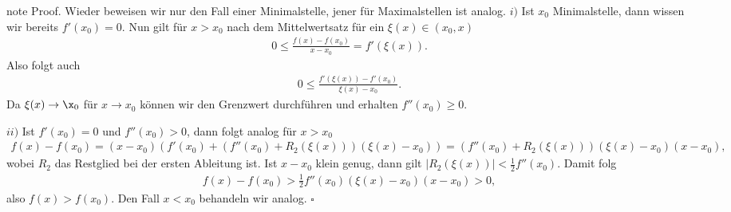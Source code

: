 \documentclass[letterpaper,10pt,english]{jupyterBook}
\begin{document}
\begin{sphinxadmonition}{note}
Proof. Wieder beweisen wir nur den Fall einer Minimalstelle, jener für Maximalstellen ist analog.
\(i)\) Ist \(x_0\) Minimalstelle, dann wissen wir bereits \(f'(x_0) = 0\). Nun gilt für \(x > x_0\) nach dem Mittelwertsatz für ein \(\xi(x) \in (x_0,x)\)
\begin{equation*}
\begin{split} 0 \leq  \frac{f(x)-f(x_0)}{x-x_0} = f'(\xi(x)).\end{split}
\end{equation*}
Also folgt auch
\begin{equation*}
\begin{split} 0 \leq \frac{f'(\xi(x)) - f'(x_0)}{\xi(x)-x_0}.\end{split}
\end{equation*}
Da \(\xi(x) \rightarrow \x_0\) für \(x \rightarrow x_0\) können wir den Grenzwert durchführen und erhalten \(f''(x_0) \geq 0\).

\(ii)\) Ist \(f'(x_0) = 0\) und \(f''(x_0) > 0\), dann folgt analog für \(x > x_0\)
\begin{equation*}
\begin{split} f(x) - f(x_0) = (x-x_0) ( f'(x_0) + (f''(x_0) + R_2(\xi(x)))(\xi(x)-x_0)) = (f''(x_0) + R_2(\xi(x)))(\xi(x)-x_0)(x-x_0),\end{split}
\end{equation*}
wobei \(R_2\) das Restglied bei der ersten Ableitung ist. Ist \(x-x_0\) klein genug, dann gilt
\(|R_2(\xi(x))| < \frac{1}2 f''(x_0)\). Damit folg
\begin{equation*}
\begin{split} f(x) - f(x_0) > \frac{1}2 f''(x_0) (\xi(x)-x_0)(x-x_0) > 0,\end{split}
\end{equation*}
also \(f(x) > f(x_0)\). Den Fall \(x < x_0\) behandeln wir analog. \(\square\)
\end{sphinxadmonition}
\end{document}
